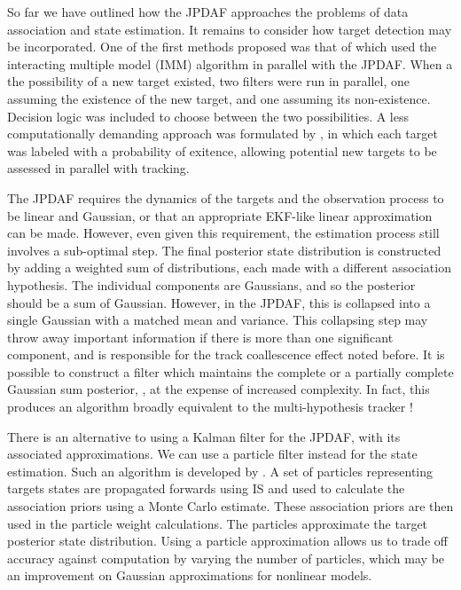 So far we have outlined how the JPDAF approaches the problems of data association and state estimation. It remains to consider how target detection may be incorporated. One of the first methods proposed was that of \cite{Bar-Shalom1989} which used the interacting multiple model (IMM) algorithm in parallel with the JPDAF. When a the possibility of a new target existed, two filters were run in parallel, one assuming the existence of the new target, and one assuming its non-existence. Decision logic was included to choose between the two possibilities. A less computationally demanding approach was formulated by \cite{Musicki1994,Musicki2004}, in which each target was labeled with a probability of exitence, allowing potential new targets to be assessed in parallel with tracking.

The JPDAF requires the dynamics of the targets and the observation process to be linear and Gaussian, or that an appropriate EKF-like linear approximation can be made. However, even given this requirement, the estimation process still involves a sub-optimal step. The final posterior state distribution is constructed by adding a weighted sum of distributions, each made with a different association hypothesis. The individual components are Gaussians, and so the posterior should be a sum of Gaussian. However, in the JPDAF, this is collapsed into a single Gaussian with a matched mean and variance. This collapsing step may throw away important information if there is more than one significant component, and is responsible for the track coallescence effect noted before. It is possible to construct a filter which maintains the complete or a partially complete Gaussian sum posterior, \cite{Singer1974,Salmond1990}, at the expense of increased complexity. In fact, this produces an algorithm broadly equivalent to the multi-hypothesis tracker \cite{Blackman2004}!

There is an alternative to using a Kalman filter for the JPDAF, with its associated approximations. We can use a particle filter instead for the state estimation. Such an algorithm is developed by \cite{Schulz2001,Karlsson2001,Vermaak2005}. A set of particles representing targets states are propagated forwards using IS and used to calculate the association priors using a Monte Carlo estimate. These association priors are then used in the particle weight calculations. The particles approximate the target posterior state distribution. Using a particle approximation allows us to trade off accuracy against computation by varying the number of particles, which may be an improvement on Gaussian approximations for nonlinear models.

